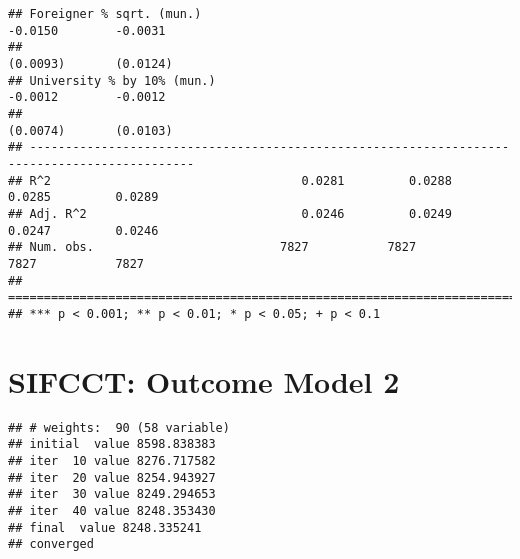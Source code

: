 \documentclass[
]{article}
\newenvironment{Shaded}{\begin{snugshade}}{\end{snugshade}}
\newcommand{\CommentTok}[1]{\textcolor[rgb]{0.56,0.35,0.01}{\textit{#1}}}
\newcommand{\DataTypeTok}[1]{\textcolor[rgb]{0.13,0.29,0.53}{#1}}
\newcommand{\DecValTok}[1]{\textcolor[rgb]{0.00,0.00,0.81}{#1}}
\newcommand{\KeywordTok}[1]{\textcolor[rgb]{0.13,0.29,0.53}{\textbf{#1}}}
\newcommand{\NormalTok}[1]{#1}
\newcommand{\OperatorTok}[1]{\textcolor[rgb]{0.81,0.36,0.00}{\textbf{#1}}}
\newcommand{\StringTok}[1]{\textcolor[rgb]{0.31,0.60,0.02}{#1}}
\begin{document}
\begin{verbatim}
## Foreigner % sqrt. (mun.)                                           -0.0150        -0.0031    
##                                                                    (0.0093)       (0.0124)   
## University % by 10% (mun.)                                         -0.0012        -0.0012    
##                                                                    (0.0074)       (0.0103)   
## ---------------------------------------------------------------------------------------------
## R^2                                   0.0281         0.0288         0.0285         0.0289    
## Adj. R^2                              0.0246         0.0249         0.0247         0.0246    
## Num. obs.                          7827           7827           7827           7827         
## =============================================================================================
## *** p < 0.001; ** p < 0.01; * p < 0.05; + p < 0.1
\end{verbatim}

\hypertarget{sifcct-outcome-model-2}{%
\section{SIFCCT: Outcome Model 2}\label{sifcct-outcome-model-2}}

\begin{Shaded}
\end{Shaded}

\begin{verbatim}
## # weights:  90 (58 variable)
## initial  value 8598.838383 
## iter  10 value 8276.717582
## iter  20 value 8254.943927
## iter  30 value 8249.294653
## iter  40 value 8248.353430
## final  value 8248.335241 
## converged
\end{verbatim}

\begin{Shaded}
\end{Shaded}
\end{document}
